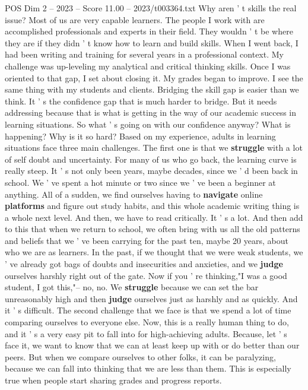 \begin{textsample}{POS Dim 2 – 2023 – Score 11.00 – 2023/t003364.txt}
Why aren ' t skills the real issue?
Most of us are very capable learners.
The people I work with are accomplished professionals and experts in their field.
They wouldn ' t be where they are if they didn ' t know how to learn and build skills.
When I went back, I had been writing and training for several years in a professional context.
My challenge was up-leveling my analytical and critical thinking skills.
Once I was oriented to that gap, I set about closing it.
My grades began to improve.
I see the same thing with my students and clients.
Bridging the skill gap is easier than we think.
It ' s the confidence gap that is much harder to bridge.
But it needs addressing because that is what is getting in the way of our academic success in learning situations.
So what ' s going on with our confidence anyway?
What is happening?
Why is it so hard?
Based on my experience, adults in learning situations face three main challenges.
The first one is that we \textbf{struggle} with a lot of self doubt and uncertainty.
For many of us who go back, the learning curve is really steep.
It ' s not only been years, maybe decades, since we ' d been back in school.
We ' ve spent a hot minute or two since we ' ve been a beginner at anything.
All of a sudden, we find ourselves having to \textbf{navigate} online \textbf{platforms} and figure out study habits, and this whole academic writing thing is a whole next level.
And then, we have to read critically.
It ' s a lot.
And then add to this that when we return to school, we often bring with us all the old patterns and beliefs that we ' ve been carrying for the past ten, maybe 20 years, about who we are as learners.
In the past, if we thought that we were weak students, we ' ve already got bags of doubts and insecurities and anxieties, and we \textbf{judge} ourselves harshly right out of the gate.
Now if you ' re thinking,"I was a good student, I got this,"-- no, no.
We \textbf{struggle} because we can set the bar unreasonably high and then \textbf{judge} ourselves just as harshly and as quickly.
And it ' s difficult.
The second challenge that we face is that we spend a lot of time comparing ourselves to everyone else.
Now, this is a really human thing to do, and it ' s a very easy pit to fall into for high-achieving adults.
Because, let ' s face it, we want to know that we can at least keep up with or do better than our peers.
But when we compare ourselves to other folks, it can be paralyzing, because we can fall into thinking that we are less than them.
This is especially true when people start sharing grades and progress reports.

\end{textsample}

